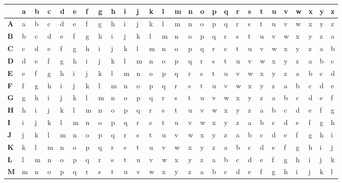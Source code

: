 \begin{table}
\begin{center}
\vspace{0.5cm}
\begin{sloppypar}
\begin{tabular}{|p{5pt}||p{3pt}p{3pt}p{3pt}p{3pt}p{3pt}p{3pt}p{3pt}p{3pt}p{3pt}p{3pt}p{3pt}p{3pt}p{3pt}p{3pt}p{3pt}p{3pt}p{3pt}p{3pt}p{3pt}p{3pt}p{3pt}p{3pt}p{3pt}p{3pt}p{3pt}p{3pt}|}

\hline
 & a & b & c & d & e & f & g & h & i & j & k & l & m & n & o & p & q & r & s
& t & u & v & w & x & y & z \\ \hline\hline
{\bf A} &a &b & c & d & e & f & g & h & i & j & k & l & m & n & o & p & q & r & s & t & u & v & w & x & y & z \\
{\bf B} &b &c & d & e & f & g & h & i & j & k & l & m & n & o & p & q & r & s & t & u & v & w & x & y & z & a\\
{\bf C} &c &d & e & f & g & h & i & j & k & l & m & n & o & p & q & r & s & t & u & v & w & x & y & z & a & b\\
{\bf D} &d &e & f & g & h & i & j & k & l & m & n & o & p & q & r & s & t & u & v & w & x & y & z & a & b & c\\
{\bf E} &e &f & g & h & i & j & k & l & m & n & o & p & q & r & s & t & u & v & w & x & y & z & a & b & c & d\\
{\bf F} &f &g & h & i & j & k & l & m & n & o & p & q & r & s & t & u & v & w & x & y & z & a & b & c & d & e\\
{\bf G} &g &h & i & j & k & l & m & n & o & p & q & r & s & t & u & v & w & x & y & z & a & b & c & d & e & f\\
{\bf H} &h &i & j & k & l & m & n & o & p & q & r & s & t & u & v & w & x & y & z & a & b & c & d & e & f & g\\
{\bf I} &i &j & k & l & m & n & o & p & q & r & s & t & u & v & w & x & y & z & a & b & c & d & e & f & g & h\\
{\bf J} &j &k & l & m & n & o & p & q & r & s & t & u & v & w & x & y & z & a & b & c & d & e & f & g & h & i\\
{\bf K} &k &l & m & n & o & p & q & r & s & t & u & v & w & x & y & z & a & b & c & d & e & f & g & h & i & j\\
{\bf L} &l &m & n & o & p & q & r & s & t & u & v & w & x & y & z & a & b & c & d & e & f & g & h & i & j & k\\
{\bf M} &m &n & o & p & q & r & s & t & u & v & w & x & y & z & a & b & c & d & e & f & g & h & i & j & k & l\\

\end{tabular}
\end{sloppypar}
\end{center}
\end{table}
